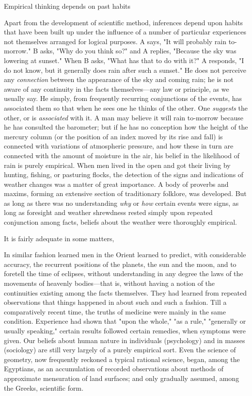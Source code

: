 \documentclass[letterpaper]{book}
\begin{document}
Empirical thinking depends on past habits

Apart from the development of scientific method, inferences depend upon
habits that have been built up under the influence of a number of
particular experiences not themselves arranged for logical purposes. A
says, "It will probably rain to-morrow." B asks, "Why do you think so?"
and A replies, "Because the sky was lowering at sunset." When B asks,
"What has that to do with it?" A responds, "I do not know, but it
generally does rain after such a sunset." He does not perceive any
\emph{connection} between the appearance of the sky and coming rain; he
is not aware of any continuity in the facts themselves---any law or
principle, as we usually say. He simply, from frequently recurring
conjunctions of the events, has associated them so that when he sees one
he thinks of the other. One \emph{suggests} the other, or is
\emph{associated} with it. A man may believe it will rain to-morrow
because he has consulted the barometer; but if he has no conception how
the height of the mercury column (or the position of an index moved by
its rise and fall) is connected with variations of atmospheric pressure,
and how these in turn are connected with the amount of moisture in the
air, his belief in the likelihood of rain is purely empirical. When men
lived in the open and got their living by hunting, fishing,
or
pasturing flocks, the detection of the signs and indications of weather
changes was a matter of great importance. A body of proverbs and maxims,
forming an extensive section of traditionary folklore, was developed.
But as long as there was no understanding \emph{why} or \emph{how}
certain events were signs, as long as foresight and weather shrewdness
rested simply upon repeated conjunction among facts, beliefs about the
weather were thoroughly empirical.

It is fairly adequate in some matters,

In similar fashion learned men in the Orient learned to predict, with
considerable accuracy, the recurrent positions of the planets, the sun
and the moon, and to foretell the time of eclipses, without
understanding in any degree the laws of the movements of heavenly
bodies---that is, without having a notion of the continuities existing
among the facts themselves. They had learned from repeated observations
that things happened in about such and such a fashion. Till a
comparatively recent time, the truths of medicine were mainly in the
same condition. Experience had shown that "upon the whole," "as a rule,"
"generally or usually speaking," certain results followed certain
remedies, when symptoms were given. Our beliefs about human nature in
individuals (psychology) and in masses (sociology) are still very
largely of a purely empirical sort. Even the science of geometry, now
frequently reckoned a typical rational science, began, among the
Egyptians, as an accumulation of recorded observations about methods of
approximate mensuration of land surfaces; and only gradually assumed,
among the Greeks, scientific form.
\end{document}
